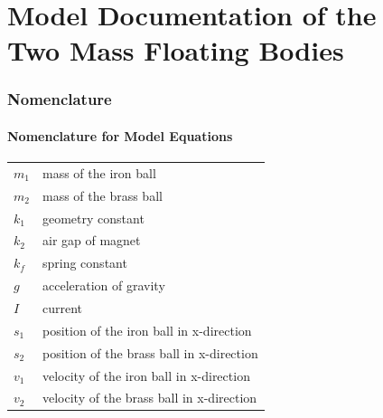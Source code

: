 \documentclass[10pt,a4paper]{article}
\begin{document}
	\part*{Model Documentation of the \\ Two Mass Floating Bodies} %
	
	
	\section{Nomenclature} %
	\subsection{Nomenclature for Model Equations} %
	
	\begin{tabular}{ll}
		$m_1$ & mass of the iron ball \\
		$m_2$ & mass of the brass ball \\
		$k_1$ & geometry constant \\
		$k_2$ & air gap of magnet \\
		$k_f$ & spring constant \\
		$g$ & acceleration of gravity \\
		$I$ & current \\
		$s_1$ & position of the iron ball in x-direction \\
		$s_2$ & position of the brass ball in x-direction \\		
		$v_1$ & velocity of the iron ball in x-direction \\
		$v_2$ & velocity of the brass ball in x-direction \\		
	\end{tabular}
	
\end{document}
